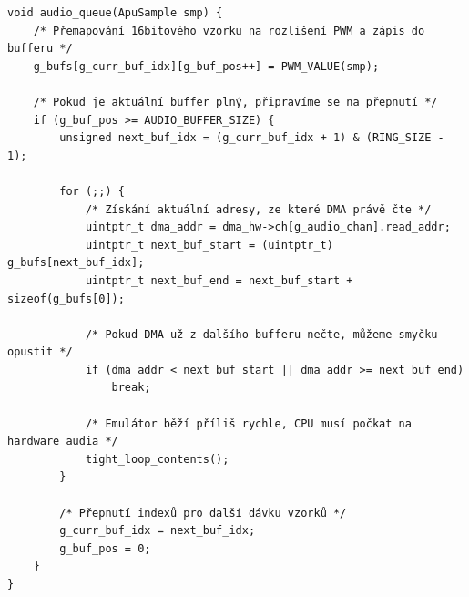 \begin{listing}[htbp]
\begin{verbatim}
void audio_queue(ApuSample smp) {
    /* Přemapování 16bitového vzorku na rozlišení PWM a zápis do bufferu */
    g_bufs[g_curr_buf_idx][g_buf_pos++] = PWM_VALUE(smp);

    /* Pokud je aktuální buffer plný, připravíme se na přepnutí */
    if (g_buf_pos >= AUDIO_BUFFER_SIZE) {
        unsigned next_buf_idx = (g_curr_buf_idx + 1) & (RING_SIZE - 1);

        for (;;) {
            /* Získání aktuální adresy, ze které DMA právě čte */
            uintptr_t dma_addr = dma_hw->ch[g_audio_chan].read_addr;
            uintptr_t next_buf_start = (uintptr_t) g_bufs[next_buf_idx];
            uintptr_t next_buf_end = next_buf_start + sizeof(g_bufs[0]);

            /* Pokud DMA už z dalšího bufferu nečte, můžeme smyčku opustit */
            if (dma_addr < next_buf_start || dma_addr >= next_buf_end)
                break;

            /* Emulátor běží příliš rychle, CPU musí počkat na hardware audia */
            tight_loop_contents();
        }

        /* Přepnutí indexů pro další dávku vzorků */
        g_curr_buf_idx = next_buf_idx;
        g_buf_pos = 0;
    }
}
\end{verbatim}
\caption{Ukládání vzorku do fronty (volného bufferu).}
\label{lst:dma_queue}
\end{listing}
